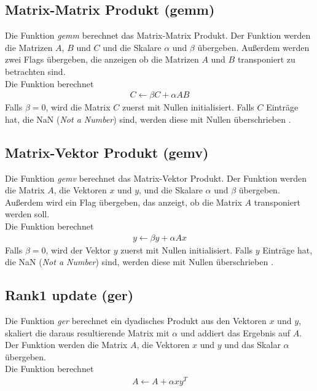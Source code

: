 \subsection{Matrix-Matrix Produkt (gemm)}
Die Funktion \textit{gemm} berechnet das Matrix-Matrix Produkt.
Der Funktion werden die Matrizen $A$, $B$ und $C$ und die Skalare $\alpha$ und $\beta$ übergeben. Außerdem werden zwei Flags übergeben, die anzeigen ob die Matrizen $A$ und $B$ transponiert zu betrachten sind.\\
Die Funktion berechnet
\begin{align}
	C \leftarrow \beta  C + \alpha  A  B
\end{align}
Falls $\beta = 0$, wird die Matrix $C$ zuerst mit Nullen initialisiert. Falls $C$ Einträge hat, die NaN (\textit{Not a Number}) sind, werden diese mit Nullen überschrieben \cite{blast}.


\subsection{Matrix-Vektor Produkt (gemv)}
Die Funktion \textit{gemv} berechnet das Matrix-Vektor Produkt.
Der Funktion werden die Matrix $A$, die Vektoren $x$ und $y$, und die Skalare $\alpha$ und $\beta$ übergeben. Außerdem wird ein Flag übergeben, das anzeigt, ob die Matrix $A$ transponiert werden soll.\\
Die Funktion berechnet
\begin{align}
y \leftarrow \beta  y + \alpha A x 
\end{align}
Falls $\beta = 0$, wird der Vektor $y$ zuerst mit Nullen initialisiert. Falls $y$ Einträge hat, die NaN (\textit{Not a Number}) sind, werden diese mit Nullen überschrieben \cite{blast}.

\subsection{Rank1 update (ger)}
Die Funktion \textit{ger}  berechnet ein dyadisches Produkt aus den Vektoren $x$ und $y$, skaliert die daraus resultierende Matrix mit $\alpha$ und addiert das Ergebnis auf $A$.\\
Der Funktion werden die Matrix $A$, die Vektoren $x$ und $y$ und das Skalar $\alpha$ übergeben.\\
Die Funktion berechnet
\begin{align}
A \leftarrow A + \alpha  x y^T
\end{align}

